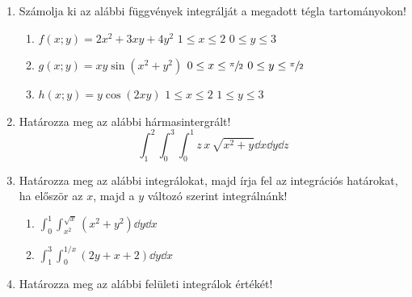\documentclass[a4paper, 12pt, fleqn]{scrartcl}
\begin{document}
\begin{enumerate}
  \item Számolja ki az alábbi függvények integrálját a megadott tégla
        tartományokon!
        \begin{enumerate}
          \item $f(x; y) = 2x^2 + 3xy + 4y^2$
                \tabto{6cm} $1 \leq x \leq 2$
                \tabto{9cm} $0 \leq y \leq 3$

          \item $g(x; y) = xy\sin(x^2 + y^2)$
                \tabto{6cm} $0 \leq x \leq \sfrac{\pi}{2}$
                \tabto{9cm} $0 \leq y \leq \sfrac{\pi}{2}$

          \item $h(x; y) = y\cos(2xy)$
                \tabto{6cm} $1 \leq x \leq 2$
                \tabto{9cm} $1 \leq y \leq 3$
        \end{enumerate}

  \item Határozza meg az alábbi hármasintergrált!
        \begin{equation*}
          \int_{1}^{2}
          \int_{0}^{3}
          \int_{0}^{1}
          z \, x \, \sqrt{x^2+y}
          \dd x \dd y \dd z
        \end{equation*}

  \item Határozza meg az alábbi integrálokat, majd írja fel az integrációs
        határokat, ha először az $x$, majd a $y$ változó szerint integrálnánk!
        \begin{multicols}{2}
          \begin{enumerate}
            \item $\displaystyle
                    \int_{0}^{1} \int_{x^2}^{\sqrt{x}}
                    \left(x^2 + y^2\right)
                    \dd y \dd x
                  $

            \item $\displaystyle
                    \int_{1}^{3} \int_{0}^{1/x}
                    \left(2y + x + 2\right)
                    \dd y \dd x
                  $
          \end{enumerate}
        \end{multicols}

  \item Határozza meg az alábbi felületi integrálok értékét!
        \setcounter{enumTemp}{0}
        \newcommand{\nextEnum}{%
          \stepcounter{enumTemp}%
          \hspace{-7mm}%
          \text{\alph{enumTemp})\;\;\;}%
        }


\end{enumerate}
\end{document}

